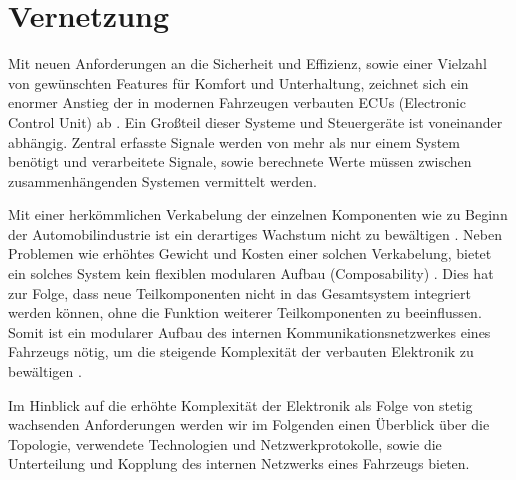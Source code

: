 \section{Vernetzung}
Mit neuen Anforderungen an die Sicherheit und Effizienz, sowie einer Vielzahl von gewünschten Features 
für Komfort und Unterhaltung, zeichnet sich ein enormer Anstieg der in modernen Fahrzeugen verbauten ECUs (Electronic Control Unit) ab \cite{TW_kim2014gateway}.
Ein Großteil dieser Systeme und Steuergeräte ist voneinander abhängig. Zentral erfasste Signale werden von mehr als nur einem
System benötigt und verarbeitete Signale, sowie berechnete Werte müssen zwischen zusammenhängenden Systemen vermittelt werden.

Mit einer herkömmlichen Verkabelung der einzelnen Komponenten wie zu Beginn der Automobilindustrie ist ein derartiges Wachstum
nicht zu bewältigen \cite{leen1999digital}. Neben Problemen wie erhöhtes Gewicht und Kosten einer solchen Verkabelung, bietet ein solches System kein flexiblen modularen Aufbau (Composability) \cite{reif2011bosch}. Dies hat zur Folge, dass neue Teilkomponenten nicht in das Gesamtsystem integriert werden können, ohne die Funktion 
weiterer Teilkomponenten zu beeinflussen. Somit ist ein modularer Aufbau des internen Kommunikationsnetzwerkes eines Fahrzeugs nötig, um die 
steigende Komplexität der verbauten Elektronik zu bewältigen \cite{reif2011bosch}.

Im Hinblick auf die erhöhte Komplexität der Elektronik als Folge von stetig wachsenden Anforderungen werden wir im Folgenden
einen Überblick über die Topologie, verwendete Technologien und Netzwerkprotokolle, sowie die Unterteilung und Kopplung des internen Netzwerks eines Fahrzeugs bieten.


